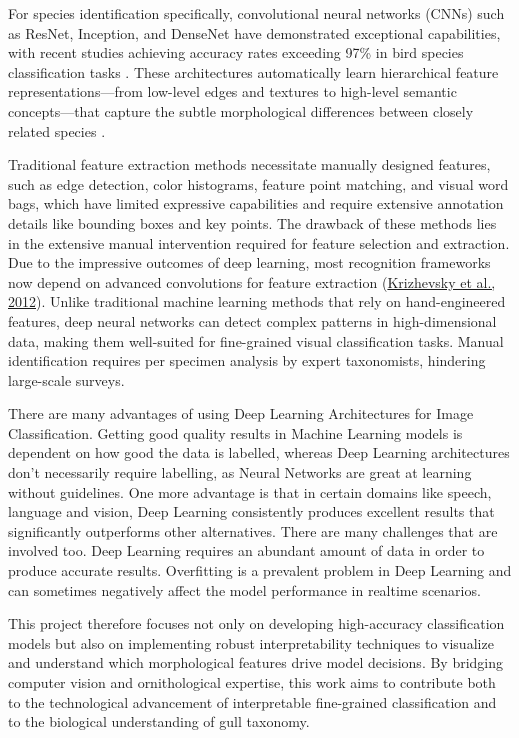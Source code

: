 \documentclass[a4paper,12pt]{article}
\begin{document}
For species identification specifically, convolutional neural networks (CNNs) such as ResNet, Inception, and DenseNet have demonstrated exceptional capabilities, with recent studies achieving accuracy rates exceeding 97\% in bird species classification tasks \citep{he2016}. These architectures automatically learn hierarchical feature representations—from low-level edges and textures to high-level semantic concepts—that capture the subtle morphological differences between closely related species \citep{simonyan2014}.


Traditional feature extraction methods necessitate manually designed features, such as edge detection, color histograms, feature point matching, and visual word bags, which have limited expressive capabilities and require extensive annotation details like bounding boxes and key points. The drawback of these methods lies in the extensive manual intervention required for feature selection and extraction. Due to the impressive outcomes of deep learning, most recognition frameworks now depend on advanced convolutions for feature extraction (\href{https://www.frontiersin.org/journals/neurorobotics/articles/10.3389/fnbot.2024.1391791/full#ref10}{Krizhevsky et al., 2012}).
Unlike traditional machine learning methods that rely on hand-engineered features, deep neural networks can detect complex patterns in high-dimensional data, making them well-suited for fine-grained visual classification tasks. Manual identification requires per specimen analysis by expert taxonomists, hindering large-scale surveys.

There are many advantages of using Deep Learning
Architectures for Image Classification. Getting good quality
results in Machine Learning models is dependent on how good
the data is labelled, whereas Deep Learning architectures don’t
necessarily require labelling, as Neural Networks are great at
learning without guidelines. One more advantage is that in
certain domains like speech, language and vision, Deep
Learning consistently produces excellent results that
significantly outperforms other alternatives. There are many
challenges that are involved too. Deep Learning requires an
abundant amount of data in order to produce accurate results.
Overfitting is a prevalent problem in Deep Learning and can
sometimes negatively affect the model performance in realtime scenarios.

This project therefore focuses not only on developing high-accuracy classification models but also on implementing robust interpretability techniques to visualize and understand which morphological features drive model decisions. By bridging computer vision and ornithological expertise, this work aims to contribute both to the technological advancement of interpretable fine-grained classification and to the biological understanding of gull taxonomy.
\end{document}
